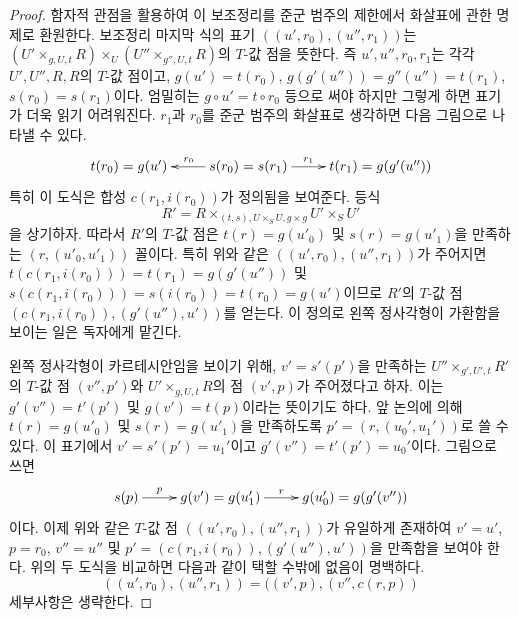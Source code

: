 \begin{proof}
함자적 관점을 활용하여 이 보조정리를 준군 범주의 제한에서 화살표에 관한
명제로 환원한다. 보조정리 마지막 식의 표기
$((u', r_0), (u'', r_1))$는
$(U' \times_{g, U, t} R) \times_U (U'' \times_{g'', U, t} R)$의
$T$-값 점을 뜻한다. 즉 $u', u'', r_0, r_1$는 각각
$U', U'', R, R$의 $T$-값 점이고,
$g(u') = t(r_0)$, $g(g'(u'')) = g''(u'') = t(r_1)$,
$s(r_0) = s(r_1)$이다. 엄밀히는 $g \circ u' = t \circ r_0$ 등으로
써야 하지만 그렇게 하면 표기가 더욱 읽기 어려워진다. $r_1$과 $r_0$를
준군 범주의 화살표로 생각하면 다음 그림으로 나타낼 수 있다.
$$
\xymatrix{
t(r_0) = g(u') &
s(r_0) = s(r_1) \ar[l]_{r_0} \ar[r]^-{r_1} &
t(r_1) = g(g'(u''))
}
$$
특히 이 도식은 합성 $c(r_1, i(r_0))$가 정의됨을 보여준다. 등식
$$
R' = R \times_{(t, s), U \times_S U, g \times g} U' \times_S U'
$$
을 상기하자. 따라서 $R'$의 $T$-값 점은
$t(r) = g(u'_0)$ 및 $s(r) = g(u'_1)$을 만족하는
$(r, (u'_0, u'_1))$ 꼴이다. 특히 위와 같은
$((u', r_0), (u'', r_1))$가 주어지면
$t(c(r_1, i(r_0))) = t(r_1) = g(g'(u''))$ 및
$s(c(r_1, i(r_0))) = s(i(r_0)) = t(r_0) = g(u')$이므로
$R'$의 $T$-값 점 $(c(r_1, i(r_0)), (g'(u''), u'))$를 얻는다.
이 정의로 왼쪽 정사각형이 가환함을 보이는 일은 독자에게 맡긴다.

\medskip\noindent
왼쪽 정사각형이 카르테시안임을 보이기 위해,
$v' = s'(p')$을 만족하는
$U'' \times_{g', U', t} R'$의 $T$-값 점 $(v'', p')$와
$U' \times_{g, U, t} R$의 점 $(v', p)$가 주어졌다고 하자.
이는 $g'(v'') = t'(p')$ 및 $g(v') = t(p)$이라는 뜻이기도 하다.
앞 논의에 의해 $t(r) = g(u'_0)$ 및 $s(r) = g(u'_1)$을 만족하도록
$p' = (r, (u_0', u_1'))$로 쓸 수 있다. 이 표기에서
$v' = s'(p') = u_1'$이고 $g'(v'') = t'(p') = u_0'$이다. 그림으로 쓰면
$$
\xymatrix{
s(p) \ar[r]^-p &
g(v') = g(u'_1) \ar[r]^-r &
g(u'_0) = g(g'(v''))
}
$$
이다. 이제 위와 같은 $T$-값 점 $((u', r_0), (u'', r_1))$가 유일하게
존재하여 $v' = u'$, $p = r_0$, $v'' = u''$ 및
$p' = (c(r_1, i(r_0)), (g'(u''), u'))$을 만족함을 보여야 한다.
위의 두 도식을 비교하면 다음과 같이 택할 수밖에 없음이 명백하다.
$$
((u', r_0), (u'', r_1)) = ((v', p), (v'', c(r, p))
$$
세부사항은 생략한다.
\end{proof}

